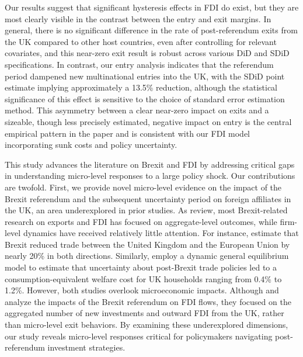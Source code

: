 \documentclass[preprint,11pt,authoryear]{elsarticle}
\begin{document}
Our results suggest that significant hysteresis effects in FDI do exist, but they are most clearly visible in the contrast between the entry and exit margins. In general, there is no significant difference in the rate of post-referendum exits from the UK compared to other host countries, even after controlling for relevant covariates, and this near-zero exit result is robust across various DiD and SDiD specifications. In contrast, our entry analysis indicates that the referendum period dampened new multinational entries into the UK, with the SDiD point estimate implying approximately a 13.5\% reduction, although the statistical significance of this effect is sensitive to the choice of standard error estimation method. This asymmetry between a clear near-zero impact on exits and a sizeable, though less precisely estimated, negative impact on entry is the central empirical pattern in the paper and is consistent with our FDI model incorporating sunk costs and policy uncertainty.

This study advances the literature on Brexit and FDI by addressing critical gaps in understanding micro-level responses to a large policy shock. Our contributions are twofold.
First, we provide novel micro-level evidence on the impact of the Brexit referendum and the subsequent uncertainty period on foreign affiliates in the UK, an area underexplored in prior studies. As \citet{dhingra2022expecting} review, most Brexit-related research on exports and FDI has focused on aggregate-level outcomes, while firm-level dynamics have received relatively little attention. For instance, \citet{kren2024} estimate that Brexit reduced trade between the United Kingdom and the European Union by nearly 20\% in both directions. Similarly, \citet{steinberg2019brexit} employ a dynamic general equilibrium model to estimate that uncertainty about post-Brexit trade policies led to a consumption-equivalent welfare cost for UK households ranging from 0.4\% to 1.2\%. However, both studies overlook microeconomic impacts.
Although \citet{breinlich2020} and \cite{cieslik2022brexit} analyze the impacts of the Brexit referendum on FDI flows, they focused on the aggregated number of new investments and outward FDI from the UK, rather than micro-level exit behaviors. By examining these underexplored dimensions, our study reveals micro-level responses critical for policymakers navigating post-referendum investment strategies.
\end{document}
